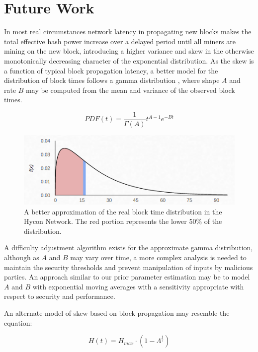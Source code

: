 \documentclass[]{article}
\begin{document}
\section{Future Work}
In most real circumstances network latency in propagating new blocks makes the total effective hash power increase over a delayed period until all miners are mining on the new block, introducing a higher variance and skew in the otherwise monotonically decreasing character of the exponential distribution.  As the skew is a function of typical block propagation latency, a better model for the distribution of block times follows a gamma distribution \cite{GammaDistDefinition}, where shape $A$ and rate $B$ may be computed from the mean and variance of the observed block times.  

\begin{equation}
PDF(t) = \frac{1}{\Gamma(A)} t^{A - 1}e^{-Bt}
\end{equation}

\begin{figure}[h]
	\centering
	\includegraphics[width=0.7\linewidth]{"./real hycon"}
	\caption{\footnotesize A better approximation of the real block time distribution in the Hycon Network. The red portion represents the lower 50\% of the distribution. \cite{GammaDistHycon}}
\end{figure}

A difficulty adjustment algorithm exists for the approximate gamma distribution, although as $A$ and $B$ may vary over time, a more complex analysis is needed to maintain the security thresholds and prevent manipulation of inputs by malicious parties.  An approach similar to our prior parameter estimation may be to model $A$ and $B$ with exponential moving averages with a sensitivity appropriate with respect to security and performance.  
\newline

An alternate model of skew based on block propagation may resemble the equation: 

\begin{equation}
	H(t) = H_{max} \cdot (1 - \Lambda^\frac{t}{\tau})
\end{equation}
\end{document}
